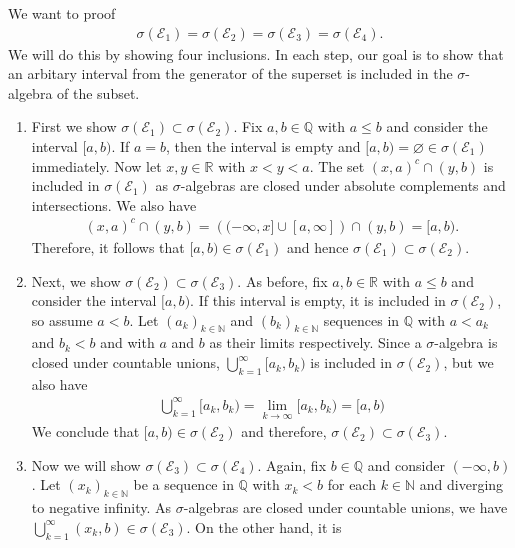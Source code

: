 \begin{solution}
    We want to proof
    \begin{align}
        \sigma (\mathcal{E}_1) = \sigma (\mathcal{E}_2) = \sigma (\mathcal{E}_3) = \sigma (\mathcal{E}_4) \text{.}
    \end{align}
    We will do this by showing four inclusions. In each step, our goal is to show that an arbitary interval from the generator of the superset is included in the \(\sigma\)-algebra of the subset.
    \begin{enumerate}
    \item First we show \(\sigma (\mathcal{E}_1) \subset \sigma (\mathcal{E}_2)\). Fix \(a, b \in \mathbb{Q}\) with \(a \leq b\) and consider the interval \([a, b)\). If \(a = b\), then the interval is empty and \([a, b) = \varnothing \in \sigma (\mathcal{E}_1)\) immediately. Now let \(x, y \in \mathbb{R}\) with \(x < y < a\). The set \((x, a)^c \cap (y, b)\) is included in \(\sigma (\mathcal{E}_1)\) as \(\sigma\)-algebras are closed under absolute complements and intersections. We also have
    \begin{align}
        (x, a)^c \cap (y, b) = \left( (-\infty, x] \cup [a, \infty] \right) \cap (y, b) = [a, b) \text{.}
    \end{align}
    Therefore, it follows that \([a, b) \in \sigma (\mathcal{E}_1) \) and hence \(\sigma (\mathcal{E}_1) \subset \sigma (\mathcal{E}_2)\).
    \item Next, we show \( \sigma (\mathcal{E}_2) \subset \sigma (\mathcal{E}_3) \). As before, fix \(a, b \in \mathbb{R}\) with \(a \leq b\) and consider the interval \([a, b)\). If this interval is empty, it is included in \(\sigma (\mathcal{E}_2)\), so assume \(a < b\). Let \((a_k)_{k \in \mathbb{N}}\) and \((b_k)_{k \in \mathbb{N}}\) sequences in \(\mathbb{Q}\) with \(a < a_k\) and \(b_k < b\) and with \(a\) and \(b\) as their limits respectively. Since a \(\sigma\)-algebra is closed under countable unions, \(\bigcup_{k=1}^\infty [a_k, b_k)\) is included in \(\sigma (\mathcal{E}_2)\), but we also have
    \begin{align}
        \bigcup_{k=1}^\infty [a_k, b_k) = \lim_{k \rightarrow \infty} [a_k, b_k) = [a, b)
    \end{align}
    We conclude that \([a, b) \in \sigma (\mathcal{E}_2)\) and therefore, \(\sigma (\mathcal{E}_2) \subset \sigma (\mathcal{E}_3)\).
    \item Now we will show \( \sigma (\mathcal{E}_3) \subset \sigma (\mathcal{E}_4)\). Again, fix \(b \in \mathbb{Q}\) and consider \((-\infty, b)\). Let \((x_k)_{k \in \mathbb{N}}\) be a sequence in \(\mathbb{Q}\) with \(x_k < b\) for each \(k \in \mathbb{N}\) and diverging to negative infinity. As \(\sigma\)-algebras are closed under countable unions, we have \(\bigcup_{k=1}^\infty (x_k, b) \in \sigma( \mathcal{E}_3 )\). On the other hand, it is

\end{enumerate}
\end{solution}
